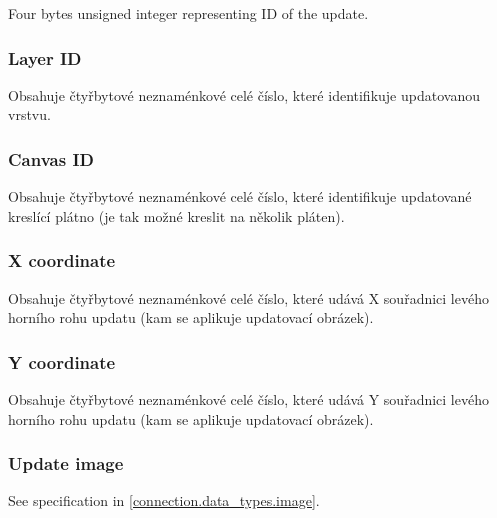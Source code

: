 Four bytes unsigned integer representing ID of the update.

\subsubsection{Layer ID}

Obsahuje čtyřbytové neznaménkové celé číslo, které identifikuje updatovanou vrstvu.

\subsubsection{Canvas ID}

Obsahuje čtyřbytové neznaménkové celé číslo, které identifikuje updatované kreslící plátno (je tak možné kreslit na několik pláten).

\subsubsection{X coordinate}

Obsahuje čtyřbytové neznaménkové celé číslo, které udává X souřadnici levého horního rohu updatu (kam se aplikuje updatovací obrázek).

\subsubsection{Y coordinate}

Obsahuje čtyřbytové neznaménkové celé číslo, které udává Y souřadnici levého horního rohu updatu (kam se aplikuje updatovací obrázek).

\subsubsection{Update image}

See specification in \ref{connection.data_types.image}.